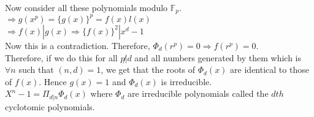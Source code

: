 \documentclass{article}
\begin{document}
Now consider all these polynomials modulo $\mathbb{F}_p$. \\
$\Rightarrow g(x^p) = \{g(x)\}^p = f(x)l(x)$ \\
$\Rightarrow f(x) | g(x) \Rightarrow \{f(x)\}^2 | x^d - 1$ \\
Now this is a contradiction. Therefore, $\Phi_d(r^p)=0 \Rightarrow f(r^p) = 0$. \\
Therefore, if we do this for all $p \not | d$ and all numbers generated by them which is $\forall n$ such that $(n,d) = 1$, we get that the roots of $\Phi_d(x)$ are identical to those of $f(x)$. Hence $g(x) = 1$ and $\Phi_d(x)$ is irreducible. \\

$X^n - 1 = \Pi_{d|n}\Phi_d(x)$ where $\Phi_d$ are irreducible polynomials called the $dth$ cyclotomic polynomials. 
\end{document}
